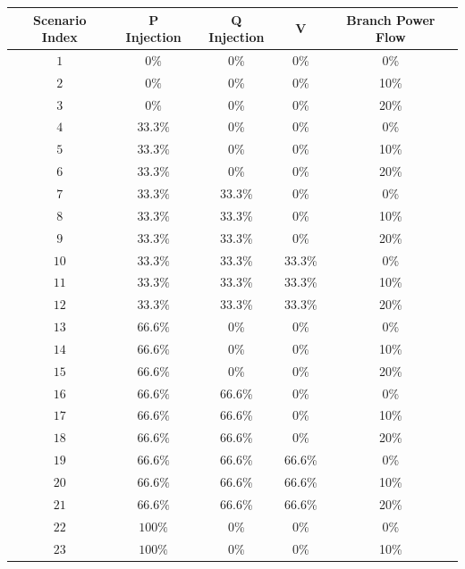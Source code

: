     \begin{table}[!h]
        \centering
        \begin{tabular}{c|c|c|c|c}
            Scenario Index & P Injection & Q Injection & V & Branch Power Flow \\ \hline
            $1$ & $0{\%} $ & 0{\%} & 0{\%} & 0{\%} \\
            $2$ & $0{\%} $ & 0{\%} & 0{\%} & 10{\%} \\ 
            $3$ & $0{\%} $ & 0{\%} & 0{\%} & 20{\%} \\
            $4$ & $33.3{\%} $ & 0{\%} & 0{\%} & 0{\%} \\
            $5$ & $33.3{\%} $ & 0{\%} & 0{\%} & 10{\%} \\ 
            $6$ & $33.3{\%} $ & 0{\%} & 0{\%} & 20{\%} \\
            $7$ & $33.3{\%} $ & 33.3{\%} & 0{\%} & 0{\%} \\
            $8$ & $33.3{\%} $ & 33.3{\%} & 0{\%} & 10{\%} \\ 
            $9$ & $33.3{\%} $ & 33.3{\%} & 0{\%} & 20{\%} \\
            $10$ & $33.3{\%} $ & 33.3{\%} & 33.3{\%} & 0{\%} \\
            $11$ & $33.3{\%} $ & 33.3{\%} & 33.3{\%} & 10{\%} \\ 
            $12$ & $33.3{\%} $ & 33.3{\%} & 33.3{\%} & 20{\%} \\        
            $13$ & $66.6{\%} $ & 0{\%} & 0{\%} & 0{\%} \\
            $14$ & $66.6{\%} $ & 0{\%} & 0{\%} & 10{\%} \\ 
            $15$ & $66.6{\%} $ & 0{\%} & 0{\%} & 20{\%} \\
            $16$ & $66.6{\%} $ & 66.6{\%} & 0{\%} & 0{\%} \\
            $17$ & $66.6{\%} $ & 66.6{\%} & 0{\%} & 10{\%} \\ 
            $18$ & $66.6{\%} $ & 66.6{\%} & 0{\%} & 20{\%} \\
            $19$ & $66.6{\%} $ & 66.6{\%} & 66.6{\%} & 0{\%} \\
            $20$ & $66.6{\%} $ & 66.6{\%} & 66.6{\%} & 10{\%} \\ 
            $21$ & $66.6{\%} $ & 66.6{\%} & 66.6{\%} & 20{\%} \\
            $22$ & $100{\%} $ & 0{\%} & 0{\%} & 0{\%} \\
            $23$ & $100{\%} $ & 0{\%} & 0{\%} & 10{\%} \\ 

\end{tabular}
\end{table}
